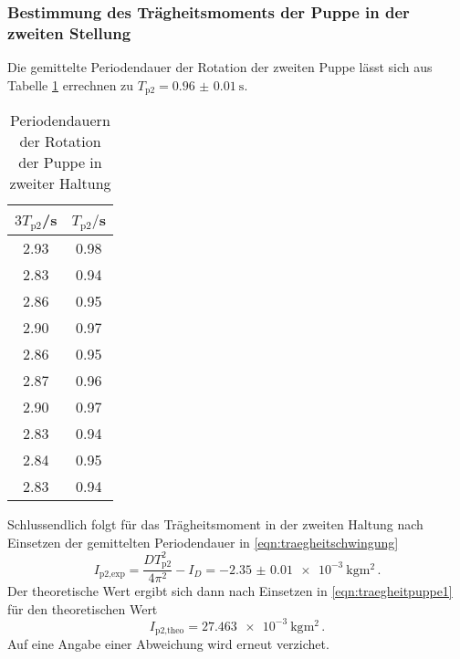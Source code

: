 \subsubsection{Bestimmung des Trägheitsmoments der Puppe in der zweiten Stellung}
Die gemittelte Periodendauer der Rotation der zweiten Puppe lässt sich aus Tabelle
\ref{tab:puppe2} errechnen zu $T_{\text{p2}}=\SI{0.96(001)}{\second}$.
\begin{table}[H]
\centering
\caption{Periodendauern der Rotation der Puppe in zweiter Haltung}
\label{tab:puppe2}
\begin{tabular}{c c}
\toprule
$3T_{\text{p2}}$/s & $T_{\text{p2}}/$s \\
\midrule
2.93 & 0.98 \\
2.83 & 0.94 \\
2.86 & 0.95 \\
2.90 & 0.97 \\
2.86 & 0.95 \\
2.87 & 0.96 \\
2.90 & 0.97 \\
2.83 & 0.94 \\
2.84 & 0.95 \\
2.83 & 0.94 \\
\bottomrule
\end{tabular}
\end{table}
Schlussendlich folgt für das Trägheitsmoment in der zweiten Haltung nach Einsetzen
der gemittelten Periodendauer in \eqref{eqn:traegheitschwingung}
\begin{equation}
  I_{\text{p2,exp}} = \frac{DT_{\text{p2}}^2}{4\pi^2}-I_D = \SI{-2.35(001)e-3}{\kilogram\meter\squared}\,.
\end{equation}
Der theoretische Wert ergibt sich dann nach Einsetzen in
\eqref{eqn:traegheitpuppe1} für den theoretischen Wert
\begin{equation}
  I_{\text{p2,theo}} = \SI{27.463e-3}{\kilogram\meter\squared}\,.
\end{equation}
Auf eine Angabe einer Abweichung wird erneut verzichet.
